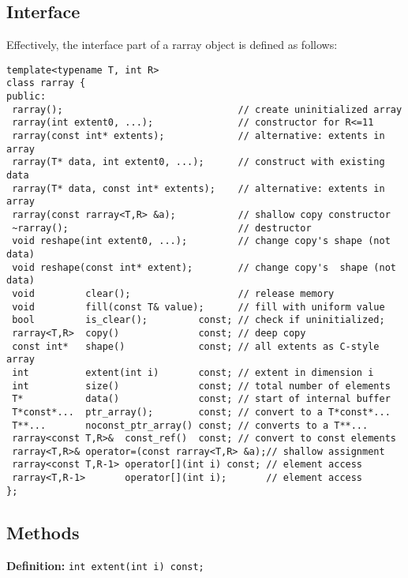 \documentclass[11pt,twoside]{article}
\begin{document}
\subsection{Interface}
Effectively, the interface part of a rarray object is defined as follows:%
\vspace{-8pt}%
\begin{framed}\vspace{-14pt}%
\begin{verbatim}
template<typename T, int R>
class rarray {
public:    
 rarray();                               // create uninitialized array
 rarray(int extent0, ...);               // constructor for R<=11
 rarray(const int* extents);             // alternative: extents in array
 rarray(T* data, int extent0, ...);      // construct with existing data
 rarray(T* data, const int* extents);    // alternative: extents in array
 rarray(const rarray<T,R> &a);           // shallow copy constructor   
 ~rarray();                              // destructor 
 void reshape(int extent0, ...);         // change copy's shape (not data)
 void reshape(const int* extent);        // change copy's  shape (not data)
 void         clear();                   // release memory
 void         fill(const T& value);      // fill with uniform value
 bool         is_clear();         const; // check if uninitialized;
 rarray<T,R>  copy()              const; // deep copy
 const int*   shape()             const; // all extents as C-style array
 int          extent(int i)       const; // extent in dimension i
 int          size()              const; // total number of elements
 T*           data()              const; // start of internal buffer
 T*const*...  ptr_array();        const; // convert to a T*const*... 
 T**...       noconst_ptr_array() const; // converts to a T**... 
 rarray<const T,R>&  const_ref()  const; // convert to const elements
 rarray<T,R>& operator=(const rarray<T,R> &a);// shallow assignment
 rarray<const T,R-1> operator[](int i) const; // element access
 rarray<T,R-1>       operator[](int i);       // element access
};
\end{verbatim}
\end{framed}



\subsection{Methods}

\noindent\textbf{Definition:} \texttt{int extent(int i) const;}
\end{document}
